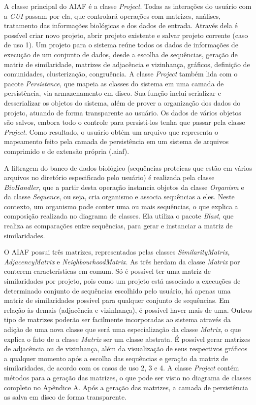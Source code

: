 A classe principal do AIAF é a classe \textit{Project}. Todas as interações do usuário com a \textit{GUI} 
passam por ela, que controlará operações com
matrizes, análises, tratamento das informações biológicas e dos dados de entrada. Através dela é possível criar novo projeto, abrir projeto existente e
salvar projeto corrente (caso de uso 1). Um projeto para o sistema reúne todos os dados de informações de execução de um conjunto de dados, desde
a escolha de sequências, geração de matriz de similaridade, matrizes de adjacência e vizinhança, gráficos, definição de comunidades, clusterização,
congruência. A classe \textit{Project} também lida com o pacote \textit{Persistence}, que mapeia as classes do sistema em uma camada de persistência, via
armazenamento em disco. Sua função inclui serializar e desserializar os objetos do sistema, além de prover
a organização dos dados do projeto, atuando de forma transparente ao usuário. Os dados de vários objetos são salvos, embora todo o controle para persisti-los
tenha que passar pela classe \textit{Project}. Como resultado, o usuário obtém um arquivo que representa o mapeamento
feito pela camada de persistência em um sistema de arquivos comprimido e de extensão própria (.aiaf).


A filtragem do banco de dados biológico (sequências proteicas que estão em vários arquivos no diretório especificado pelo usuário) é realizada pela classe
\textit{BioHandler}, que a partir desta operação instancia objetos da classe \textit{Organism} e da classe \textit{Sequence}, ou seja, cria organismo e associa
sequências a eles. Neste contexto, um organismo pode conter uma ou mais sequências, o que explica a composição realizada no diagrama de classes.
Ela utiliza o pacote \textit{Blast}, que realiza as comparações entre sequências, para gerar e instanciar a matriz de similaridades.

O AIAF possui três matrizes, representadas pelas classes \textit{SimilarityMatrix}, \textit{AdjacencyMatrix} e \textit{NeighbourhoodMatrix}. As três herdam
da classe \textit{Matrix} por conterem características em comum. Só é possível ter uma matriz de similaridades por projeto, pois como um projeto está associado
a execuções de determinado conjunto de sequências escolhido pelo usuário, há apenas uma matriz de similaridades possível para qualquer conjunto de sequências.
Em relação às demais (adjacência e vizinhança), é possível haver mais de uma. Outros tipo de matrizes poderão ser
facilmente incorporadas ao sistema através da adição de uma nova classe que será uma especialização da classe \textit{Matrix}, o que explica o fato de a classe
\textit{Matrix} ser um classe abstrata. É possível gerar matrizes de adjacência ou de vizinhança, além da visualização de seus respectivos gráficos a qualquer
momento após a escolha das sequências e geração da matriz de similaridades, de acordo com os casos de uso 2, 3 e 4. A classe \textit{Project} contém métodos
para a geração das matrizes, o que pode ser visto no diagrama de classes completo no Apêndice A.
Após a geração das matrizes, a camada de persistência as salva em disco de forma transparente.

